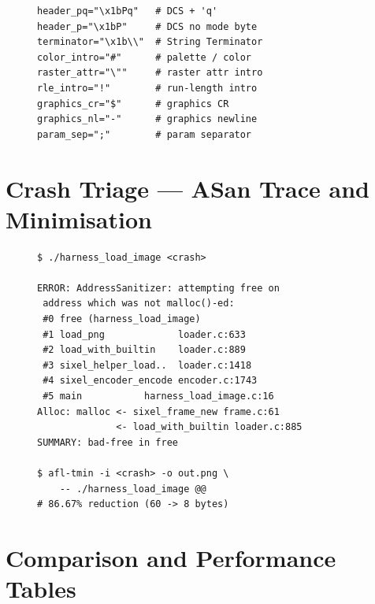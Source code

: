 \documentclass[letterpaper,twocolumn,10pt]{article}
\begin{document}
\begin{figure}[H]
\begin{lstlisting}[basicstyle=\ttfamily\scriptsize,numbers=none,caption={Contents of \texttt{sixel.dict}.},label={lst:dict}]
header_pq="\x1bPq"   # DCS + 'q'
header_p="\x1bP"     # DCS no mode byte
terminator="\x1b\\"  # String Terminator
color_intro="#"      # palette / color
raster_attr="\""     # raster attr intro
rle_intro="!"        # run-length intro
graphics_cr="$"      # graphics CR
graphics_nl="-"      # graphics newline
param_sep=";"        # param separator
\end{lstlisting}
\end{figure}

\section{Crash Triage --- ASan Trace and Minimisation}
\label{app:crash}
\vspace{-0.8em}

\begin{figure}[H]
\begin{lstlisting}[basicstyle=\ttfamily\scriptsize,numbers=none,caption={Crash reproduction (abridged) and \texttt{afl-tmin}.},label={lst:asan}]
$ ./harness_load_image <crash>

ERROR: AddressSanitizer: attempting free on
 address which was not malloc()-ed:
 #0 free (harness_load_image)
 #1 load_png             loader.c:633
 #2 load_with_builtin    loader.c:889
 #3 sixel_helper_load..  loader.c:1418
 #4 sixel_encoder_encode encoder.c:1743
 #5 main           harness_load_image.c:16
Alloc: malloc <- sixel_frame_new frame.c:61
              <- load_with_builtin loader.c:885
SUMMARY: bad-free in free

$ afl-tmin -i <crash> -o out.png \
    -- ./harness_load_image @@
# 86.67% reduction (60 -> 8 bytes)
\end{lstlisting}
\end{figure}

\section{Comparison and Performance Tables}
\label{app:tables}
\vspace{-0.8em}
\end{document}
